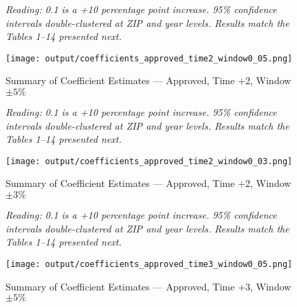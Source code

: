 \documentclass{article}
\begin{document}
\renewcommand{\thetable}{A\arabic{table}}
\renewcommand{\thefigure}{A\arabic{figure}}

\listoffigures
\listoftables

\clearpage
\pagebreak

\begin{figure}
    
\caption{Summary of Coefficient Estimates --- Approved, Time +2, Window $\pm 5\%$}

\emph{Reading: 0.1 is a +10 percentage point increase. 95\% confidence intervals double-clustered at ZIP and year levels. Results match the Tables 1--14 presented next.}
 
\begin{center} 
    \texttt{[image: output/coefficients\_approved\_time2\_window0\_05.png]}
\end{center}

\end{figure}

\clearpage
\pagebreak

\begin{figure}
    
    \caption{Summary of Coefficient Estimates --- Approved, Time +2, Window $\pm 3\%$}

    \emph{Reading: 0.1 is a +10 percentage point increase. 95\% confidence intervals double-clustered at ZIP and year levels. Results match the Tables 1--14 presented next.}

    \begin{center}
        \texttt{[image: output/coefficients\_approved\_time2\_window0\_03.png]}
    \end{center}
    
    \end{figure}
    
    \clearpage
    \pagebreak

\begin{figure}
    
    \caption{Summary of Coefficient Estimates --- Approved, Time +3, Window $\pm 5\%$}
    
    \emph{Reading: 0.1 is a +10 percentage point increase. 95\% confidence intervals double-clustered at ZIP and year levels. Results match the Tables 1--14 presented next.}

    \begin{center}
        \texttt{[image: output/coefficients\_approved\_time3\_window0\_05.png]}
    \end{center}
    
\end{figure}
    
\end{document}
